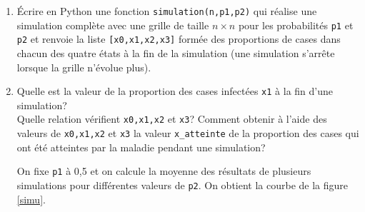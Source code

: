 \begin{enumerate}
\begin{verbatim}
randomd.random()
    Return the next random floating point number
    in the range [0.0, 1.0)
\end{verbatim}
Avec les r\`egles de transition du mod\`ele utilis\'e, l'\'etat de la grille \'evolue entre les instants $t$ et $t+1$ tant qu'il existe au moins une case infect\'ee.
\item \'Ecrire en Python une fonction \texttt{simulation(n,p1,p2)} qui r\'ealise une simulation compl\`ete avec une grille de taille $n\times n$ pour les probabilit\'es \texttt{p1} et \texttt{p2} et renvoie la liste \texttt{[x0,x1,x2,x3]} form\'ee des proportions de cases dans chacun des quatre \'etats \`a la fin de la simulation (une simulation s'arr\^ete lorsque la grille n'\'evolue plus).
\item Quelle est la valeur de la proportion des cases infect\'ees \texttt{x1} \`a la fin d'une simulation?\\
Quelle relation v\'erifient \texttt{x0,x1,x2} et \texttt{x3}? Comment obtenir \`a l'aide des valeurs de \texttt{x0,x1,x2} et \texttt{x3} la valeur \texttt{x\_atteinte} de la proportion des cases qui ont \'et\'e atteintes par la maladie pendant une simulation?

On fixe \texttt{p1} \`a 0,5 et on calcule la moyenne des r\'esultats de plusieurs simulations pour diff\'erentes valeurs de \texttt{p2}. On obtient la courbe de la figure \ref{simu}.



\end{enumerate}
